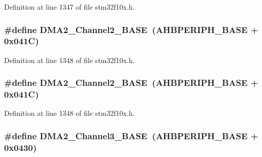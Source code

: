 Definition at line 1347 of file stm32f10x.\+h.

\subsubsection[{\texorpdfstring{D\+M\+A2\+\_\+\+Channel2\+\_\+\+B\+A\+SE}{DMA2_Channel2_BASE}}]{\setlength{\rightskip}{0pt plus 5cm}\#define D\+M\+A2\+\_\+\+Channel2\+\_\+\+B\+A\+SE~({\bf A\+H\+B\+P\+E\+R\+I\+P\+H\+\_\+\+B\+A\+SE} + 0x041\+C)}\hypertarget{group___peripheral__memory__map_ga22f39f23c879c699b88e04a629f69d1c}{}\label{group___peripheral__memory__map_ga22f39f23c879c699b88e04a629f69d1c}


Definition at line 1348 of file stm32f10x.\+h.

\subsubsection[{\texorpdfstring{D\+M\+A2\+\_\+\+Channel2\+\_\+\+B\+A\+SE}{DMA2_Channel2_BASE}}]{\setlength{\rightskip}{0pt plus 5cm}\#define D\+M\+A2\+\_\+\+Channel2\+\_\+\+B\+A\+SE~({\bf A\+H\+B\+P\+E\+R\+I\+P\+H\+\_\+\+B\+A\+SE} + 0x041\+C)}\hypertarget{group___peripheral__memory__map_ga22f39f23c879c699b88e04a629f69d1c}{}\label{group___peripheral__memory__map_ga22f39f23c879c699b88e04a629f69d1c}


Definition at line 1348 of file stm32f10x.\+h.

\subsubsection[{\texorpdfstring{D\+M\+A2\+\_\+\+Channel3\+\_\+\+B\+A\+SE}{DMA2_Channel3_BASE}}]{\setlength{\rightskip}{0pt plus 5cm}\#define D\+M\+A2\+\_\+\+Channel3\+\_\+\+B\+A\+SE~({\bf A\+H\+B\+P\+E\+R\+I\+P\+H\+\_\+\+B\+A\+SE} + 0x0430)}\hypertarget{group___peripheral__memory__map_ga6f2369b8bc155fb55a28891987605c2c}{}\label{group___peripheral__memory__map_ga6f2369b8bc155fb55a28891987605c2c}


